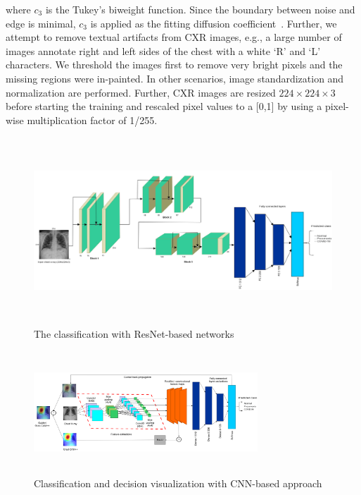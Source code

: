 \documentclass[conference]{IEEEtran}
\begin{document}
\noindent where $c_{3}$ is the Tukey's biweight function. Since the boundary between noise and edge is minimal, $c_{3}$ is applied as the fitting diffusion coefficient~\cite{95}. Further, we attempt to remove textual artifacts from CXR images, e.g., a large number of images annotate right and left sides of the chest with a white `R' and `L' characters. We threshold the images first to remove very bright pixels and the missing regions were in-painted. In other scenarios, image standardization and normalization are performed. 
Further, CXR images are resized $224 \times 224 \times 3$ before starting the training and rescaled pixel values to a [0,1] by using a pixel-wise multiplication factor of 1/255. %

\begin{figure}
	\centering
	\includegraphics[width=0.9\linewidth,height=70mm]{densenet.png}
	\caption{The classification with ResNet-based networks} 
	\label{fig:resnet}
\end{figure}
\fi

\begin{figure}[h]
	\centering
	\includegraphics[width=0.75\textwidth,height=46mm]{wf.png}
    \caption{Classification and decision visualization with CNN-based approach}	
	\label{fig:viz}
	\vspace{-2mm}
\end{figure}
\end{document}
